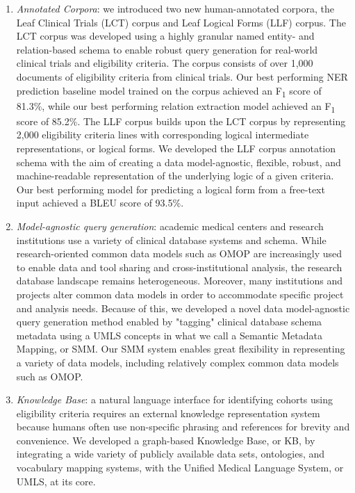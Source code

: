 \documentclass[../main.tex]{subfiles}
\begin{document}
\begin{enumerate}
    \item \textit{Annotated Corpora}: we introduced two new human-annotated corpora, the Leaf Clinical Trials (LCT) corpus and Leaf Logical Forms (LLF) corpus. The LCT corpus was developed using a highly granular named entity- and relation-based schema to enable robust query generation for real-world clinical trials and eligibility criteria. The corpus consists of over 1,000 documents of eligibility criteria from clinical trials. Our best performing NER prediction baseline model trained on the corpus achieved an F\textsubscript{1} score of 81.3\%, while our best performing relation extraction model achieved an F\textsubscript{1} score of 85.2\%. The LLF corpus builds upon the LCT corpus by representing 2,000 eligibility criteria lines with corresponding logical intermediate representations, or logical forms. We developed the LLF corpus annotation schema with the aim of creating a data model-agnostic, flexible, robust, and machine-readable representation of the underlying logic of a given criteria. Our best performing model for predicting a logical form from a free-text input achieved a BLEU score of 93.5\%.
    \item \textit{Model-agnostic query generation}: academic medical centers and research institutions use a variety of clinical database systems and schema. While research-oriented common data models such as OMOP are increasingly used to enable data and tool sharing and cross-institutional analysis, the research database landscape remains heterogeneous. Moreover, many institutions and projects alter common data models in order to accommodate specific project and analysis needs. Because of this, we developed a novel data model-agnostic query generation method enabled by "tagging" clinical database schema metadata using a UMLS concepts in what we call a Semantic Metadata Mapping, or SMM. Our SMM system enables great flexibility in representing a variety of data models, including relatively complex common data models such as OMOP.
    \item \textit{Knowledge Base}: a natural language interface for identifying cohorts using eligibility criteria requires an external knowledge representation system because humans often use non-specific phrasing and references for brevity and convenience. We developed a graph-based Knowledge Base, or KB, by integrating a wide variety of publicly available data sets, ontologies, and vocabulary mapping systems, with the Unified Medical Language System, or UMLS, at its core. 

\end{enumerate}
\end{document}
